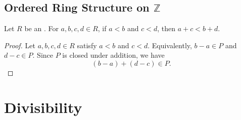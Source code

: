 





\subsection{Ordered Ring Structure on \texorpdfstring{$\mathbb Z$}{Z}}












\begin{lemma}
    Let $R$ be an .
    For $a,b,c,d \in R$, if $a < b$ and $c < d$, then $a + c < b+d$.
\end{lemma}
\begin{proof}
    Let $a,b,c,d \in R$ satisfy $a < b$ and $c < d$. Equivalently, $b-a \in P$ and $d-c \in P$. Since $P$ is closed under addition, we have
    $$(b-a) + (d-c) \in P.$$
\end{proof}


\section{Divisibility}

